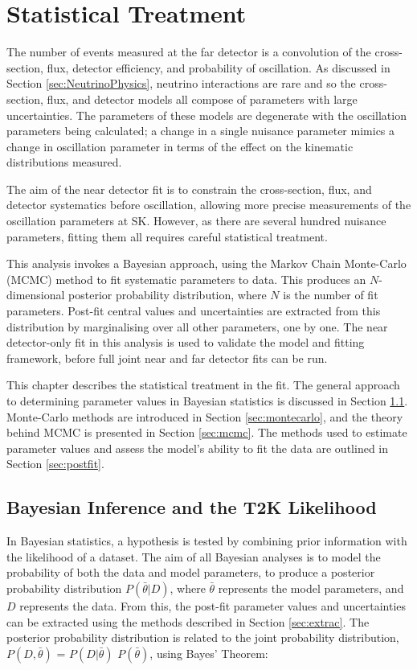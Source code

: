 \chapter{Statistical Treatment}\label{sec:stats}

The number of events measured at the far detector is a convolution of the cross-section, flux, detector efficiency, and probability of oscillation. As discussed in Section \ref{sec:NeutrinoPhysics}, neutrino interactions are rare and so the cross-section, flux, and detector models all compose of parameters with large uncertainties. The parameters of these models are degenerate with the oscillation parameters being calculated; a change in a single nuisance parameter mimics a change in oscillation parameter in terms of the effect on the kinematic distributions measured.

The aim of the near detector fit is to constrain the cross-section, flux, and detector systematics before oscillation, allowing more precise measurements of the oscillation parameters at SK. However, as there are several hundred nuisance parameters, fitting them all requires careful statistical treatment.

This analysis invokes a Bayesian approach, using the Markov Chain Monte-Carlo (MCMC) method to fit systematic parameters to data. This produces an $N$-dimensional posterior probability distribution, where $N$ is the number of fit parameters. Post-fit central values and uncertainties are extracted from this distribution by marginalising over all other parameters, one by one. The near detector-only fit in this analysis is used to validate the model and fitting framework, before full joint near and far detector fits can be run. 

This chapter describes the statistical treatment in the fit. The general approach to determining parameter values in Bayesian statistics is discussed in Section \ref{sec:bayes}. Monte-Carlo methods are introduced in Section \ref{sec:montecarlo}, and the theory behind MCMC is presented in Section \ref{sec:mcmc}. The methods used to estimate parameter values and assess the model's ability to fit the data are outlined in Section \ref{sec:postfit}.

\section{Bayesian Inference and the T2K Likelihood}\label{sec:bayes}

In Bayesian statistics, a hypothesis is tested by combining prior information with the likelihood of a dataset. The aim of all Bayesian analyses is to model the probability of both the data and model parameters, to produce a posterior probability distribution $P(\bar{\theta}|D)$, where $\bar{\theta}$ represents the model parameters, and $D$ represents the data. From this, the post-fit parameter values and uncertainties can be extracted using the methods described in Section \ref{sec:extrac}. The posterior probability distribution is related to the joint probability distribution, $P(D,\bar{\theta})$ = $P(D|\bar{\theta})$ $P(\bar{\theta})$, using Bayes' Theorem:

